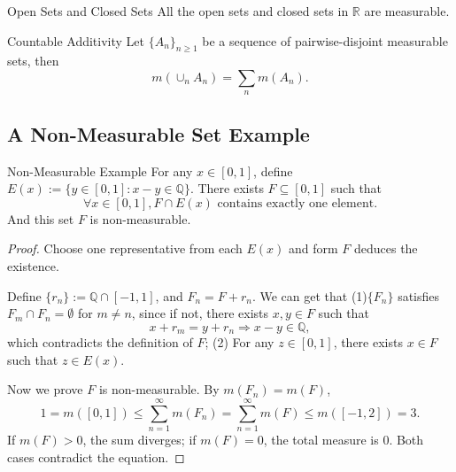 \begin{corollary}{Open Sets and Closed Sets}{}
  All the open sets and closed sets in $\mathbb{R}$ are measurable.
\end{corollary}

\begin{theorem}{Countable Additivity}{}
  Let $\{A_n\}_{n \geq 1}$ be a sequence of pairwise-disjoint measurable sets, then
  \begin{equation}
    m(\cup _n A_n) = \sum\limits_n m(A_n).
  \end{equation}
\end{theorem}


\subsection{A Non-Measurable Set Example}

\begin{example}{Non-Measurable Example}{}
  For any $x \in [0, 1]$, define $E(x) := \{y \in [0, 1]: x - y \in \mathbb{Q}\}$.
  There exists $F \subseteq [0, 1]$ such that
  \begin{equation}
    \forall x \in [0, 1], F \cap E(x) \text{ contains exactly one element}.
  \end{equation}
  And this set $F$ is non-measurable.
\end{example}

\begin{proof}
  Choose one representative from each $E(x)$ and form $F$ deduces the existence.

  Define $\{r_n\} := \mathbb{Q} \cap [-1, 1]$, and $F_n = F + r_n$.
  We can get that
  (1)$\{F_n\}$ satisfies $F_m \cap F_n = \emptyset$ for $m \neq n$, since if not,
  there exists $x, y \in F$ such that
  \begin{equation}
    x + r_m = y + r_n \Rightarrow x - y \in \mathbb{Q},
  \end{equation}
  which contradicts the definition of $F$;
  (2) For any $z \in [0, 1]$, there exists $x \in F$ such that $z \in E(x)$.

  Now we prove $F$ is non-measurable. By $m(F_n) = m(F)$,
  \begin{equation}
    1 = m([0, 1]) \leq \sum\limits_{n = 1}^{\infty} m(F_n)
    = \sum\limits_{n = 1}^{\infty} m(F) \leq m([-1, 2]) = 3.
  \end{equation}
  If $m(F) > 0$, the sum diverges; if $m(F) = 0$, the total measure is $0$.
  Both cases contradict the equation.
\end{proof}



